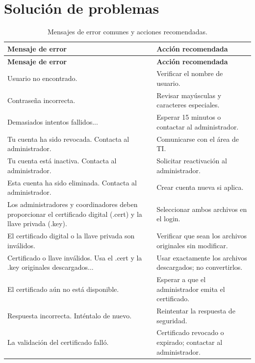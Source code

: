 \documentclass[10pt,letterpaper]{report}
\begin{document}
\chapter{Solución de problemas}

\begin{longtable}{p{} p{}}
\caption{Mensajes de error comunes y acciones recomendadas.}\label{tab:errores}\\
\toprule
\textbf{Mensaje de error} & \textbf{Acción recomendada}\\
\midrule
\endfirsthead
\toprule
\textbf{Mensaje de error} & \textbf{Acción recomendada}\\
\midrule
\endhead
\bottomrule
\endfoot
Usuario no encontrado.                         & Verificar el nombre de usuario.\\
Contraseña incorrecta.                         & Revisar mayúsculas y caracteres especiales.\\
Demasiados intentos fallidos...                & Esperar 15 minutos o contactar al administrador.\\
Tu cuenta ha sido revocada. Contacta al administrador. & Comunicarse con el área de TI.\\
Tu cuenta está inactiva. Contacta al administrador. & Solicitar reactivación al administrador.\\
Esta cuenta ha sido eliminada. Contacta al administrador. & Crear cuenta nueva si aplica.\\
Los administradores y coordinadores deben proporcionar el certificado digital (.cert) y la llave privada (.key). & Seleccionar ambos archivos en el login.\\
El certificado digital o la llave privada son inválidos. & Verificar que sean los archivos originales sin modificar.\\
Certificado o llave inválidos. Usa el .cert y la .key originales descargados... & Usar exactamente los archivos descargados; no convertirlos.\\
El certificado aún no está disponible.         & Esperar a que el administrador emita el certificado.\\
Respuesta incorrecta. Inténtalo de nuevo.      & Reintentar la respuesta de seguridad.\\
La validación del certificado falló.           & Certificado revocado o expirado; contactar al administrador.\\

\end{longtable}
\end{document}
